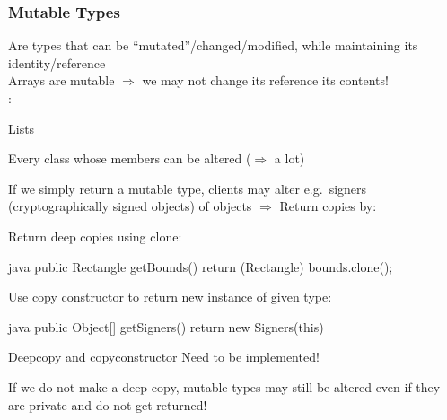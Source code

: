 \subsubsection{Mutable Types}
\label{subsubsec:MutableTypes}
\begin{defnbox}\nospacing
  \begin{defn}\label{defn:Mutable}
    Are types that can be ``mutated''/changed/modified, while
    maintaining its identity/reference\\
    Arrays are mutable $\Rightarrow$ we may not change its reference
     its contents!\\
    :
    \begin{itemizenosep}
        \item Lists
        \item Every class whose members can be altered ($\Rightarrow$ a lot)
    \end{itemizenosep}
  \end{defn}
\end{defnbox}
\begin{sectionbox}\nospacing
  If we simply return a mutable type, clients may alter
  e.g.\ signers (cryptographically signed objects) of objects $\Rightarrow$
  Return copies by:
  \begin{itemizenosep}
      \item Return deep copies using clone:
      \begin{mintlinebox}{java}
        public Rectangle getBounds(){ return (Rectangle) bounds.clone();}
      \end{mintlinebox}
      \item Use copy constructor to return new instance of given type:
      \begin{mintlinebox}{java}
        public Object[] getSigners(){ return new Signers(this) }
      \end{mintlinebox}
  \end{itemizenosep}
\end{sectionbox}
\begin{notebox}[Notes]\nospacing
  \begin{itemizenosep}
      \item Deepcopy and copyconstructor Need to be implemented!
      \item If we do not make a deep copy, mutable types may still
      be altered even if they are private and do not get returned!
  \end{itemizenosep}
\end{notebox}
